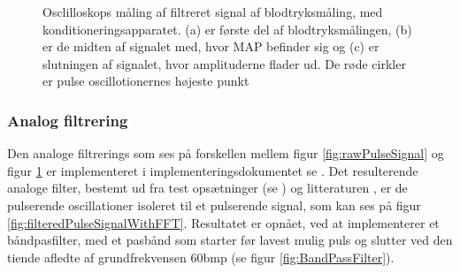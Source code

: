 \begin{figure}[H]
	\centering
	\caption{Osclilloskops måling af filtreret signal af blodtryksmåling, med konditioneringsapparatet. (a) er første del af blodtryksmålingen, (b) er de midten af signalet med, hvor MAP befinder sig og (c) er slutningen af signalet, hvor amplituderne flader ud. De røde cirkler er pulse oscillotionernes højeste punkt}\label{fig:filteredPulseSignal}
\end{figure}

\subsubsection{Analog filtrering}
Den analoge filtrerings som ses på forskellen mellem figur \ref{fig:rawPulseSignal} og figur \ref{fig:filteredPulseSignal} er implementeret i implementeringsdokumentet se . 
Det resulterende analoge filter, bestemt ud fra test opsætninger (se ) og litteraturen , er de pulserende oscillationer isoleret til et pulserende signal, som kan ses på figur \ref*{fig:filteredPulseSignalWithFFT}. Resultatet er opnået, ved at implementerer et båndpasfilter, med et pasbånd som starter før lavest mulig puls og slutter ved den tiende afledte af grundfrekvensen 60bmp (se figur \ref*{fig:BandPassFilter}).

